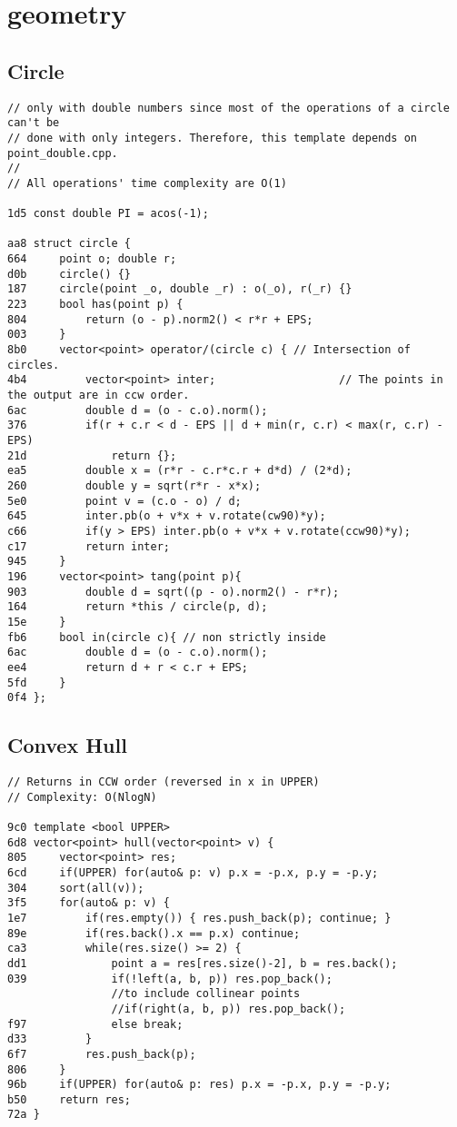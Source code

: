\documentclass[11pt, a4paper, twoside]{article}
\begin{document}
%
%

\section{geometry}

\subsection{Circle}
\begin{lstlisting}
// only with double numbers since most of the operations of a circle can't be 
// done with only integers. Therefore, this template depends on point_double.cpp.
// 
// All operations' time complexity are O(1)

1d5 const double PI = acos(-1);

aa8 struct circle {
664     point o; double r;
d0b     circle() {}
187     circle(point _o, double _r) : o(_o), r(_r) {}
223     bool has(point p) { 
804         return (o - p).norm2() < r*r + EPS;
003     }
8b0     vector<point> operator/(circle c) { // Intersection of circles.
4b4         vector<point> inter;                   // The points in the output are in ccw order.
6ac         double d = (o - c.o).norm();
376         if(r + c.r < d - EPS || d + min(r, c.r) < max(r, c.r) - EPS)
21d             return {};
ea5         double x = (r*r - c.r*c.r + d*d) / (2*d);
260         double y = sqrt(r*r - x*x);
5e0         point v = (c.o - o) / d;
645         inter.pb(o + v*x + v.rotate(cw90)*y);
c66         if(y > EPS) inter.pb(o + v*x + v.rotate(ccw90)*y);
c17         return inter;
945     }
196     vector<point> tang(point p){
903         double d = sqrt((p - o).norm2() - r*r);
164         return *this / circle(p, d);
15e     }
fb6     bool in(circle c){ // non strictly inside
6ac         double d = (o - c.o).norm();
ee4         return d + r < c.r + EPS;
5fd     }
0f4 };
\end{lstlisting}

\subsection{Convex Hull}
\begin{lstlisting}
// Returns in CCW order (reversed in x in UPPER)
// Complexity: O(NlogN)

9c0 template <bool UPPER>
6d8 vector<point> hull(vector<point> v) {
805 	vector<point> res;
6cd 	if(UPPER) for(auto& p: v) p.x = -p.x, p.y = -p.y;
304 	sort(all(v));
3f5 	for(auto& p: v) {
1e7 		if(res.empty()) { res.push_back(p); continue; }
89e 		if(res.back().x == p.x) continue;
ca3 		while(res.size() >= 2) {
dd1 			point a = res[res.size()-2], b = res.back();
039 			if(!left(a, b, p)) res.pop_back();
    			//to include collinear points
    			//if(right(a, b, p)) res.pop_back();
f97 			else break;
d33 		}
6f7 		res.push_back(p);
806 	}
96b 	if(UPPER) for(auto& p: res) p.x = -p.x, p.y = -p.y;
b50 	return res;
72a }
\end{lstlisting}
\end{document}
